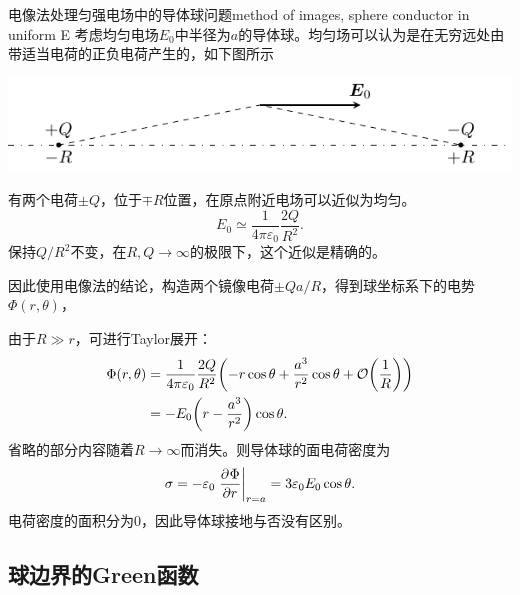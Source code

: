 \begin{example}{电像法处理匀强电场中的导体球问题}{method of images, sphere conductor in uniform E}
    考虑均匀电场$E_0$中半径为$a$的导体球。均匀场可以认为是在无穷远处由带适当电荷的正负电荷产生的，如下图所示
    \begin{center}
        \includegraphics{figures/uniform_E_approx.pdf}
        \label{fig:uniform E approx +-q}
    \end{center}
    有两个电荷$\pm Q$，位于$\mp R$位置，在原点附近电场可以近似为均匀。
    \[
        E_0\simeq\frac1{4\pi\varepsilon_0}\frac{2Q}{R^2}.
    \]
    保持$Q/R^2$不变，在$R,Q\to\infty$的极限下，这个近似是精确的。

    因此使用电像法的结论，构造两个镜像电荷$\pm Qa/R$，得到球坐标系下的电势$\Phi(r,\theta)$，

    由于$R\gg r$，可进行Taylor展开：
    \begin{align}
        \notag
        \Phi(r,\theta)&=\frac1{4\pi\varepsilon_0}\frac{2Q}{R^2}\biggl(-r\cos\theta+\frac{a^3}{r^2}\cos\theta+\mathcal O\biggl(\frac1R\biggr)\biggr)\\
        &=-E_0\biggl(r-\frac{a^3}{r^2}\biggr)\cos\theta.
    \end{align}
    省略的部分内容随着$R\to\infty$而消失。则导体球的面电荷密度为
    \begin{equation}
        \sigma=-\varepsilon_0\left.\frac{\partial^{{}}\Phi}{\partial{r}^{{}}}\right\rvert_{r=a}=3\varepsilon_0E_0\cos\theta.
    \end{equation}
    电荷密度的面积分为0，因此导体球接地与否没有区别。
\end{example}

\subsection{球边界的Green函数}
\label{ssec:Green function, sphere}

